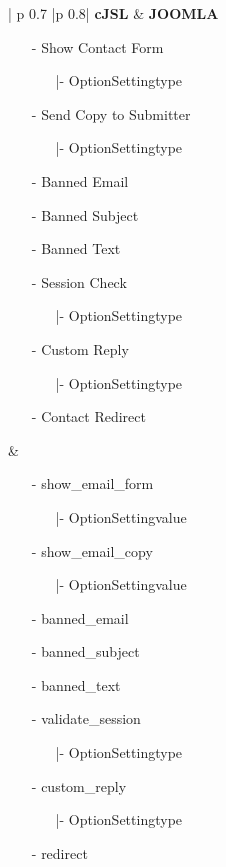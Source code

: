 \begin{minipage}{0.7\textwidth}
\begin{longtable}{| p {0.7\textwidth} |p {0.8\textwidth}|}
\hline
\textbf{cJSL}
&  
\textbf{JOOMLA} \\ \hline
 \begin{enumerate}
	\item[-] Show Contact Form
		\begin{enumerate}
	   			\item[|-] OptionSettingtype
	   		\end{enumerate} 
	\item[-] Send Copy to Submitter
		\begin{enumerate}
	   			\item[|-] OptionSettingtype
	   		\end{enumerate}
	\item[-] Banned Email 
	\item[-] Banned Subject 
	\item[-] Banned Text
	\item[-] Session Check
		\begin{enumerate}
	   			\item[|-] OptionSettingtype
	   		\end{enumerate} 
	\item[-] Custom Reply
		\begin{enumerate}
	   			\item[|-] OptionSettingtype
	   		\end{enumerate} 
	\item[-] Contact Redirect
	\end{enumerate}
 &
 \begin{enumerate}
	\item[-] show\_email\_form
		\begin{enumerate}
	   			\item[|-] OptionSettingvalue
	   		\end{enumerate} 
	\item[-] show\_email\_copy
		\begin{enumerate}
	   			\item[|-] OptionSettingvalue
	   		\end{enumerate} 
	\item[-] banned\_email 
	\item[-] banned\_subject 
	\item[-] banned\_text 
	\item[-] validate\_session
		\begin{enumerate}
	   			\item[|-] OptionSettingtype
	   		\end{enumerate} 
	\item[-] custom\_reply
		\begin{enumerate}
	   			\item[|-] OptionSettingtype
	   		\end{enumerate} 
	\item[-] redirect
	\end{enumerate}
\\ \hline
\end{longtable}
\end{minipage}



